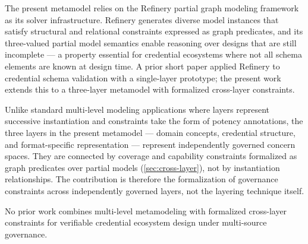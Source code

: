 The present metamodel relies on the Refinery partial graph modeling framework \citep{marussy_refinery_2024} as its solver infrastructure. Refinery generates diverse model instances that satisfy structural and relational constraints expressed as graph predicates, and its three-valued partial model semantics enable reasoning over designs that are still incomplete --- a property essential for credential ecosystems where not all schema elements are known at design time. A prior short paper \citep{farkas_prolog-based_2024} applied Refinery to credential schema validation with a single-layer prototype; the present work extends this to a three-layer metamodel with formalized cross-layer constraints.

Unlike standard multi-level modeling applications where layers represent successive instantiation and constraints take the form of potency annotations, the three layers in the present metamodel --- domain concepts, credential structure, and format-specific representation --- represent independently governed concern spaces. They are connected by coverage and capability constraints formalized as graph predicates over partial models (\ref{sec:cross-layer}), not by instantiation relationships. The contribution is therefore the formalization of governance constraints across independently governed layers, not the layering technique itself.

No prior work combines multi-level metamodeling with formalized cross-layer constraints for verifiable credential ecosystem design under multi-source governance.
